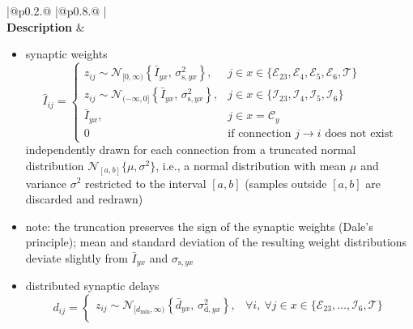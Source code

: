 \documentclass[10pt,a4paper,twoside,american]{article}
\theoremstyle{definitionstyle}
\begin{document}
\clearpage
\begin{table}[H]
\begin{tabular}{
  |@{\hspace*{\marg}}p{}@{\hspace*{\marg}}
  |@{\hspace*{\marg}}p{}@{\hspace*{\marg}}
  |}
  \hline 
  \\
  \hline 
  \textbf{Description} &
  \begin{itemize}
  \item synaptic weights
  \begin{equation}
	  \hat{I}_{ij} = \begin{cases}
      z_{ij} \sim \mathcal{N}_{[0,\infty)}\left\{\bar{I}_{yx},\,\sigma_{\text{s},yx}^2\right\}, & j \in x\in\{\mathcal{E}_{23},\mathcal{E}_{4},\mathcal{E}_{5},\mathcal{E}_{6},\mathcal{T}\} \\
      z_{ij} \sim \mathcal{N}_{(-\infty,0]}\left\{\bar{I}_{yx},\,\sigma_{\text{s},yx}^2\right\}, & j \in x\in\{\mathcal{I}_{23},\mathcal{I}_{4},\mathcal{I}_{5},\mathcal{I}_{6}\} \\
      \bar{I}_{yx}, & j \in x=\mathcal{C}_y \\
      0             & \text{if connection $j\to{}i$ does not exist}
      \end{cases}
  \end{equation}
  independently drawn for each connection from a truncated normal distribution $\mathcal{N}_{[a,b]}\{\mu,\sigma^2\}$, i.e., a normal distribution with mean $\mu$ and variance $\sigma^2$ restricted to the interval $[a,b]$ (samples outside $[a,b]$ are discarded and redrawn)
  \item[] note: the truncation preserves the sign of the synaptic weights (Dale's principle); mean and standard deviation of the resulting weight distributions deviate slightly from $\bar{I}_{yx}$ and $\sigma_{\text{s},yx}$
  \item distributed synaptic delays
  \begin{equation}
      d_{ij} = \begin{cases}
              z_{ij} \sim \mathcal{N}_{[d_\text{min},\infty)}\left\{\bar{d}_{yx},\,\sigma_{\text{d},yx}^2\right\}, & \forall i,\ \forall j \in x\in\{\mathcal{E}_{23},\ldots,\mathcal{I}_{6},\mathcal{T}\} \\

\end{cases}
\end{equation}
\end{itemize}
\end{tabular}
\end{table}
\end{document}
